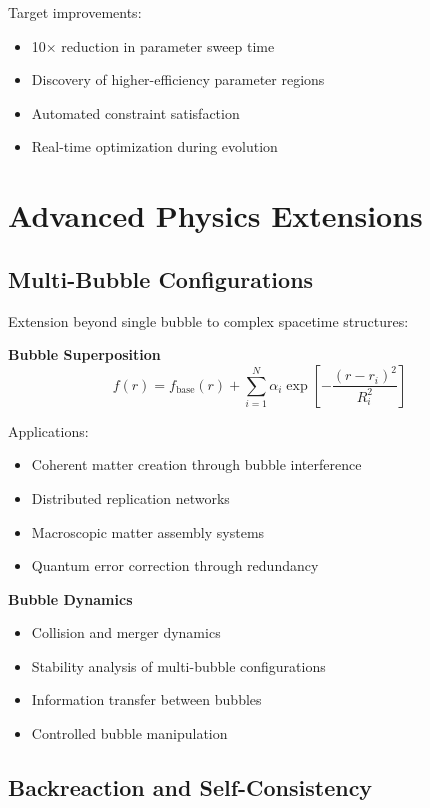 \documentclass[11pt]{article}
\begin{document}
Target improvements:
\begin{itemize}
\item 10× reduction in parameter sweep time
\item Discovery of higher-efficiency parameter regions
\item Automated constraint satisfaction
\item Real-time optimization during evolution
\end{itemize}

\section{Advanced Physics Extensions}

\subsection{Multi-Bubble Configurations}

Extension beyond single bubble to complex spacetime structures:

\textbf{Bubble Superposition}
\begin{equation}
f(r) = f_{\text{base}}(r) + \sum_{i=1}^N \alpha_i \exp\left[-\frac{(r-r_i)^2}{R_i^2}\right]
\end{equation}

Applications:
\begin{itemize}
\item Coherent matter creation through bubble interference
\item Distributed replication networks
\item Macroscopic matter assembly systems
\item Quantum error correction through redundancy
\end{itemize}

\textbf{Bubble Dynamics}
\begin{itemize}
\item Collision and merger dynamics
\item Stability analysis of multi-bubble configurations
\item Information transfer between bubbles
\item Controlled bubble manipulation
\end{itemize}

\subsection{Backreaction and Self-Consistency}
\end{document}
